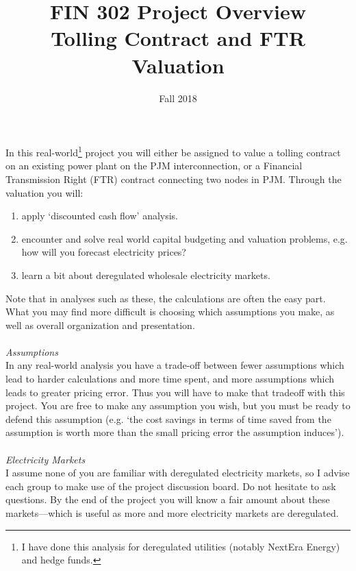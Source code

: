 \documentclass{article}
\title{FIN 302 Project Overview\\
Tolling Contract and FTR Valuation }
\date{Fall 2018}
\begin{document}
\maketitle
\noindent In this real-world\footnote{I have done this analysis for deregulated utilities (notably NextEra Energy) and hedge funds.} project you will either be assigned to value a tolling contract on an existing power plant on the PJM interconnection, or a Financial Transmission Right (FTR) contract connecting two nodes in PJM.  Through the valuation you will:
\begin{enumerate}
\item apply `discounted cash flow' analysis.
\item encounter and solve real world capital budgeting and valuation problems, e.g. how will you forecast electricity prices?
\item learn a bit about deregulated wholesale electricity markets.  
\end{enumerate}
Note that in analyses such as these, the calculations are often the easy part.  What you may find more difficult is choosing which assumptions you make, as well as overall organization and presentation.  \\
\\
{\it Assumptions}\\
In any real-world analysis you have a trade-off between fewer assumptions which lead to harder calculations and more time spent, and more assumptions which leads to greater pricing error.  Thus you will have to make that tradeoff with this project.  You are free to make any assumption you wish, but you must be ready to defend this assumption (e.g. `the cost savings in terms of time saved from the assumption is worth more than the small pricing error the assumption induces').      \\
\\
{\it Electricity Markets}\\
I assume none of you are familiar with deregulated electricity markets, so I advise each group to make use of the project discussion board.  Do not hesitate to ask questions.  By the end of the project you will know a fair amount about these markets---which is useful as more and more electricity markets are deregulated. 
\end{document}
